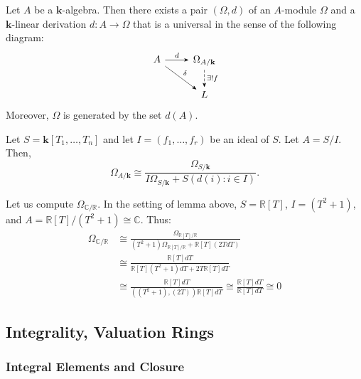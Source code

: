 \documentclass{template}
\begin{document}
\begin{definition}
    Let $A$ be a $\mathbf{k}$-algebra. Then there exists a pair $(\Omega,d)$
    of an $A$-module $\Omega$ and a $\mathbf{k}$-linear derivation $d: A \to \Omega$
    that is a universal in the sense of the following diagram:
    \[
    \begin{tikzcd}
        A \arrow[-Stealth]{r}{d} 
        \arrow[-Stealth]{rd}{\delta} & \Omega_{A/\mathbf{k}} \arrow[-Stealth, dashed]{d}{\exists! f}  \\
        & L
    \end{tikzcd}
    \]
    Moreover, $\Omega$ is generated by the set $d(A)$.
\end{definition}

\begin{lemma}
    Let $S=\mathbf{k}[T_1,\dots,T_n]$ and let $I=(f_1,\dots,f_r)$ be an ideal of
    $S$. Let $A = S/I$. Then,
    \begin{equation*}
        \Omega_{A/\mathbf{k}} \cong \frac{\Omega_{S/\mathbf{k}}}{I\Omega_{S/\mathbf{k}} + S(d(i): i \in I)}.
    \end{equation*}
\end{lemma}

\begin{example}
    Let us compute $\Omega_{\mathbb{C}/\mathbb{R}}$. In the setting of lemma above,
    $S=\mathbb{R}[T]$, $I=(T^2+1)$, and $A=\mathbb{R}[T]/(T^2+1) \cong \mathbb{C}$. Thus:
    \begin{align*}
        \Omega_{\mathbb{C}/\mathbb{R}} &\cong \frac{\Omega_{\mathbb{R}[T]/\mathbb{R}}}{(T^2+1)\Omega_{\mathbb{R}[T]/\mathbb{R}}+\mathbb{R}[T](2TdT)} \\
        &\cong \frac{\mathbb{R}[T]dT}{\mathbb{R}[T](T^2+1)dT + 2T\mathbb{R}[T]dT}\\
        &\cong \frac{\mathbb{R}[T]dT}{((T^2+1),(2T))\mathbb{R}[T]dT} \cong \frac{\mathbb{R}[T]dT}{\mathbb{R}[T]dT} \cong 0
    \end{align*}
\end{example}

\subsection{Integrality, Valuation Rings}

\subsubsection{Integral Elements and Closure}
\end{document}
